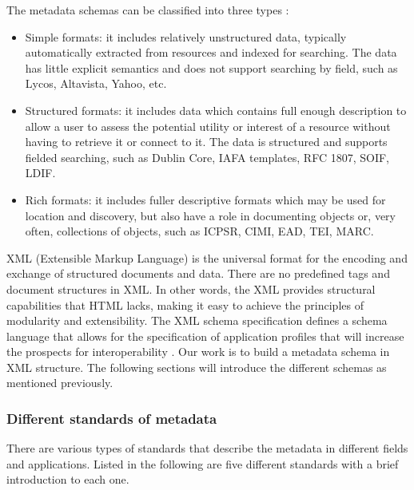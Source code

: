 The metadata schemas can be classified into three types \cite{dempsey1997specification}:
\begin{itemize}
	\item Simple formats: it includes relatively unstructured data, typically automatically extracted from resources and indexed for searching. 
	The data has little explicit semantics and does not support searching by field, such as Lycos, Altavista, Yahoo, etc.
	\item Structured formats: it includes data which contains full enough description to allow a user to assess the potential utility or interest of a resource without having to retrieve it or connect to it. 
	The data is structured and supports fielded searching, such as Dublin Core, IAFA templates, RFC 1807, SOIF, LDIF.
	\item Rich formats: it includes fuller descriptive formats which may be used for location and discovery, 
	but also have a role in documenting objects or, very often, collections of objects, such as ICPSR, CIMI, EAD, TEI, MARC.
\end{itemize}

XML (Extensible Markup Language) is the universal format for the encoding and exchange of structured documents and data. 
There are no predefined tags and document structures in XML. 
In other words, the XML provides structural capabilities that HTML lacks, making it easy to achieve the principles of modularity and extensibility. 
The XML schema specification defines a schema language that allows for the specification of application profiles that will increase the prospects for interoperability \cite{duval2002metadata}. 
Our work is to build a metadata schema in XML structure. The following sections will introduce the different schemas as mentioned previously.


\subsubsection*{Different standards of metadata}
\label{sec:mets}
There are various types of standards that describe the metadata in different fields and applications. 
Listed in the following are five different standards with a brief introduction to each one.


